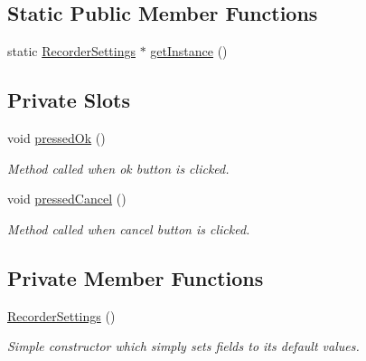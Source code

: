 \subsection*{Static Public Member Functions}
\begin{DoxyCompactItemize}
\item 
static \hyperlink{class_recorder_settings}{Recorder\-Settings} $\ast$ \hyperlink{class_recorder_settings_a84bf47c17de7d6270fe088196aeb5d5e}{get\-Instance} ()
\end{DoxyCompactItemize}
\subsection*{Private Slots}
\begin{DoxyCompactItemize}
\item 
void \hyperlink{class_recorder_settings_acfc0d09c132e85e92c6971bef2654355}{pressed\-Ok} ()
\begin{DoxyCompactList}\small\item\em Method called when ok button is clicked. \end{DoxyCompactList}\item 
void \hyperlink{class_recorder_settings_aff57d6592ef843d215c963cae1c5d9cc}{pressed\-Cancel} ()
\begin{DoxyCompactList}\small\item\em Method called when cancel button is clicked. \end{DoxyCompactList}\end{DoxyCompactItemize}
\subsection*{Private Member Functions}
\begin{DoxyCompactItemize}
\item 
\hyperlink{class_recorder_settings_a05f587beb2af361b273f0688c32072cb}{Recorder\-Settings} ()
\begin{DoxyCompactList}\small\item\em Simple constructor which simply sets fields to its default values. \end{DoxyCompactList}\end{DoxyCompactItemize}
